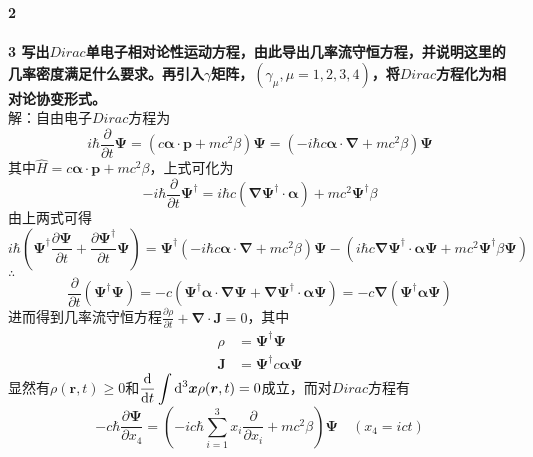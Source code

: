 \documentclass[12pt]{article}
\numberwithin{equation}{section}	 %
\begin{document}
\begin{spacing}{1.5}
\textbf{2 \quad }
~\\
~\\
\textbf{3 \quad 写出$Dirac$单电子相对论性运动方程，由此导出几率流守恒方程，并说明这里的几率密度满足什么要求。再引入$\gamma$矩阵，$(\gamma_{\mu},\mu=1,2,3,4)$，将$Dirac$方程化为相对论协变形式。}
~\\
解：自由电子$Dirac$方程为
\begin{equation}
i\hbar\frac{\partial}{\partial t}\bm\Psi = \left(c\bm{\alpha \cdot p} +mc^{2}\beta\right)\bm\Psi = \left(-i\hbar c\bm{\alpha \cdot \nabla} +mc^{2}\beta\right)\bm\Psi
\end{equation}
其中$\hat{H} = c\bm{\alpha \cdot p} +mc^{2}\beta$，上式可化为
\begin{equation}
-i\hbar\frac{\partial}{\partial t}\bm\Psi^{\dagger} = i\hbar c\left(\bm{\nabla\Psi^{\dagger} \cdot \alpha} \right) +mc^{2}\bm\Psi^{\dagger}\beta
\end{equation}
由上两式可得
\begin{equation}
i\hbar\left( \bm\Psi^{\dagger}\frac{\partial\bm\Psi}{\partial t} + \frac{\partial\bm\Psi^{\dagger}}{\partial t}\bm\Psi \right) = \bm\Psi^{\dagger}\left(-i\hbar c\bm{\alpha \cdot \nabla} +mc^{2}\beta\right)\bm\Psi - \left( i\hbar c\bm{\nabla\Psi^{\dagger} \cdot \alpha}\bm\Psi  +mc^{2}\bm\Psi^{\dagger}\beta\bm\Psi \right)
\end{equation}
$\therefore$
\begin{equation}
\frac{\partial}{\partial t}\left( \bm\Psi^{\dagger}\bm\Psi \right) = -c \left( \bm\Psi^{\dagger}\bm{\alpha \cdot \nabla}\bm\Psi + \bm{\nabla\Psi^{\dagger}\cdot\alpha}\bm\Psi \right) = -c\bm\nabla\left( \bm\Psi^{\dagger}\bm\alpha\bm\Psi \right)
\end{equation}
进而得到几率流守恒方程$\displaystyle \frac{\partial \rho}{\partial t} + \bm{\nabla \cdot J}=0$，其中
\begin{equation}
\begin{aligned}
\rho &= \bm\Psi^{\dagger}\bm\Psi \\
\bm{J} &= \bm\Psi^{\dagger}c\bm\alpha\bm\Psi
\end{aligned}
\end{equation}
显然有$\rho(\bm{r},t) \ge 0$和$\displaystyle \frac{\mathop{}\!\mathrm{d}}{\mathop{}\!\mathrm{d} t}\int\mathop{}\!\mathrm{d}^{3}\bm{x}\rho(\bm{r},t) = 0$成立，而对$Dirac$方程有
\begin{equation}
-c\hbar\frac{\partial\bm\Psi}{\partial x_{4}} = \left( -ic\hbar\sum_{i=1}^{3}x_{i}\frac{\partial}{\partial x_{i}} + mc^{2}\beta \right) \bm\Psi \quad (x_{4}=ict)
\end{equation}

\end{spacing}
\end{document}
